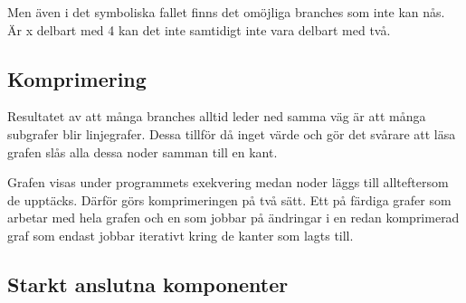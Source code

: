 Men även i det symboliska fallet finns det omöjliga branches som inte
kan nås. Är x delbart med 4 kan det inte samtidigt inte vara delbart
med två.

\subsection{Komprimering}
Resultatet av att många branches alltid leder ned samma väg är att
många subgrafer blir linjegrafer. Dessa tillför då inget värde och gör
det svårare att läsa grafen slås alla dessa noder samman till en kant.

Grafen visas under programmets exekvering medan noder läggs till
allteftersom de upptäcks. Därför görs komprimeringen på två sätt. Ett
på färdiga grafer som arbetar med hela grafen och en som jobbar på
ändringar i en redan komprimerad graf som endast jobbar iterativt
kring de kanter som lagts till.

\subsection{Starkt anslutna komponenter}
